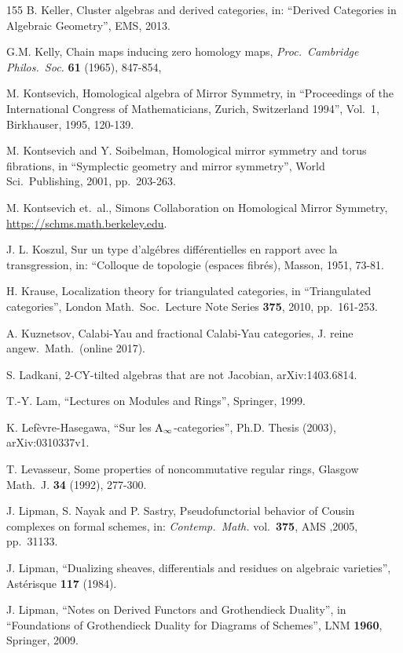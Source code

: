 \begin{thebibliography}{155}
 B. Keller,
Cluster algebras and derived categories, in:
``Derived Categories in Algebraic Geometry'', 
EMS, 2013.

 G.M. Kelly, 
Chain maps inducing zero homology maps, 
{\em Proc.\ Cambridge Philos.\ Soc.} {\bf 61} (1965), 847-854,

 M. Kontsevich, 
Homological algebra of Mirror Symmetry, 
in ``Proceedings of the International Congress of Mathematicians, Zurich, 
Switzerland 1994'', Vol.\ 1, Birkhauser,  1995, 120-139.

 M. Kontsevich and Y. Soibelman, 
Homological mirror symmetry and torus fibrations, 
in ``Symplectic geometry and mirror symmetry'', World Sci.\ Publishing, 
2001, pp.\ 203-263.

 M. Kontsevich et.\ al., 
Simons Collaboration on Homological Mirror Symmetry, 
\url{https://schms.math.berkeley.edu}.

 J. L. Koszul, 
Sur un type d'alg\'ebres diff\'erentielles en rapport
avec la transgression, in:
``Colloque de topologie (espaces fibr\'es), 
Masson, 1951, 73-81.

 H. Krause, 
Localization theory for triangulated categories, 
in ``Triangulated categories'', London Math.\ Soc.\ Lecture Note 
Series {\bf 375}, 2010, pp.\ 161-253.

 A. Kuznetsov,
Calabi-Yau and fractional Calabi-Yau categories,
J. reine angew.\ Math.\ (online 2017). 

 S. Ladkani,
2-CY-tilted algebras that are not Jacobian,
arXiv:1403.6814.

 T.-Y. Lam,
``Lectures on Modules and Rings'', Springer, 1999.

 K. Lef\`evre-Hasegawa,
``Sur les $\mathrm{A}_{\infty}$-categories'', Ph.D. Thesis (2003), 
arXiv:0310337v1.

 T. Levasseur, 
Some properties of noncommutative regular rings,
Glasgow Math.\ J. {\bf 34} (1992), 277-300. 

 J. Lipman, S. Nayak and P. Sastry, 
Pseudofunctorial behavior of Cousin complexes on formal schemes, 
in: {\em Contemp.\ Math.} vol.\ {\bf 375}, AMS ,2005, pp.\ 31133.

 J. Lipman,
``Dualizing sheaves, differentials and residues on algebraic varieties'',
Ast\'erisque {\bf 117} (1984).

 J. Lipman,
``Notes on Derived Functors and Grothendieck Duality'', 
in ``Foundations of Grothendieck Duality for Diagrams of Schemes'',
LNM {\bf 1960}, Springer, 2009.


\end{thebibliography}
